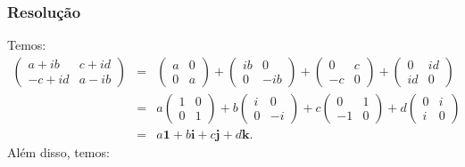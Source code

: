 \documentclass[10pt,a4paper]{article}
\begin{document}
\subsubsection*{Resolução}

Temos:
\[
\begin{array}{rcl}
\begin{pmatrix}
a+ib&c+id\\-c+id&a-ib
\end{pmatrix}&=&\begin{pmatrix}
a&0\\0&a
\end{pmatrix}+\begin{pmatrix}
ib&0\\0&-ib
\end{pmatrix}+\begin{pmatrix}
0&c\\-c&0
\end{pmatrix}+\begin{pmatrix}
0&id\\id&0
\end{pmatrix}
\\&=&a\begin{pmatrix}
1&0\\0&1
\end{pmatrix}+b\begin{pmatrix}
i&0\\0&-i
\end{pmatrix}+c\begin{pmatrix}
0&1\\-1&0
\end{pmatrix}+d\begin{pmatrix}
0&i\\i&0
\end{pmatrix}\\&=&
a\textbf{1}+b\textbf{i}+c\textbf{j}+d\textbf{k}.
\end{array}
\]
Além disso, temos:
\end{document}
